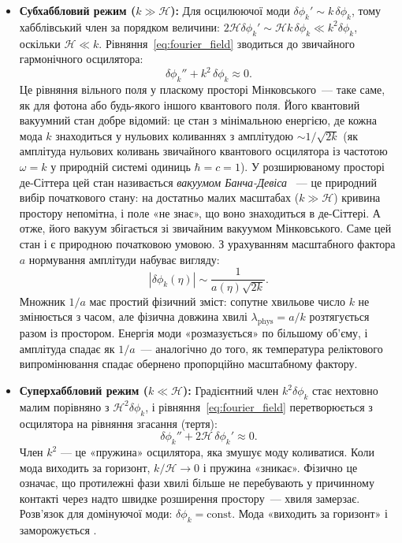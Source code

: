 \begin{itemize}
  \item \textbf{Субхаббловий режим ($k \gg \mathcal{H}$):}
        Для осцилюючої моди $\delta\phi_k' \sim k\,\delta\phi_k$, тому хабблівський член
        за порядком величини: $2\mathcal{H}\delta\phi_k' \sim \mathcal{H}k\,\delta\phi_k \ll k^2\delta\phi_k$,
        оскільки $\mathcal{H} \ll k$. Рівняння~\eqref{eq:fourier_field} зводиться до
        звичайного гармонічного осцилятора:
        \begin{equation*}
          \delta\phi_k'' + k^2\,\delta\phi_k \approx 0.
        \end{equation*}
        Це рівняння вільного поля у пласкому просторі Мінковського~--- таке саме,
        як для фотона або будь-якого іншого квантового поля. Його квантовий
        вакуумний стан добре відомий: це стан з мінімальною енергією, де кожна мода $k$
        знаходиться у нульових коливаннях з амплітудою $\sim 1/\sqrt{2k}$ (як амплітуда нульових коливань звичайного
        квантового осцилятора із частотою $\omega = k$ у природній системі одиниць $\hbar = c = 1$). У розширюваному просторі де-Сіттера цей стан
        називається \emph{вакуумом Банча-Девіса} \cite{bunch_davies_1978}~--- це
        природний вибір початкового стану: на достатньо малих масштабах ($k \gg \mathcal{H}$)
        кривина простору непомітна, і поле «не знає», що воно знаходиться в де-Сіттері.
        А отже, його вакуум збігається зі звичайним вакуумом Мінковського. Саме цей
        стан і є природною початковою умовою. З урахуванням масштабного фактора $a$
        нормування амплітуди набуває вигляду:
        \begin{equation*}
          |\delta\phi_k(\eta)| \sim \frac{1}{a(\eta) \sqrt{2k}}.
        \end{equation*}
        Множник $1/a$ має простий фізичний зміст: сопутне хвильове число $k$ не змінюється
        з часом, але фізична довжина хвилі $\lambda_\mathrm{phys} = a/k$ розтягується
        разом із простором. Енергія моди «розмазується» по більшому об'єму, і амплітуда
        спадає як $1/a$~--- аналогічно до того, як температура реліктового
        випромінювання спадає обернено пропорційно масштабному фактору.
  \item \textbf{Суперхаббловий режим ($k \ll \mathcal{H}$):}
        Градієнтний член $k^2\delta\phi_k$ стає нехтовно малим порівняно з
        $\mathcal{H}^2\delta\phi_k$, і рівняння~\eqref{eq:fourier_field} перетворюється
        з осцилятора на рівняння згасання (тертя):
        \begin{equation*}
          \delta\phi_k'' + 2\mathcal{H}\,\delta\phi_k' \approx 0.
        \end{equation*}
        Член $k^2$ — це «пружина» осцилятора, яка змушує моду коливатися. Коли мода
        виходить за горизонт, $k/\mathcal{H} \to 0$ і пружина «зникає». Фізично це означає,
        що протилежні фази хвилі більше не перебувають у причинному контакті через надто
        швидке розширення простору~--- хвиля замерзає. Розв'язок для домінуючої моди:
        $\delta\phi_k = \mathrm{const}$. Мода «виходить за горизонт» і заморожується \cite{hawking_1982}.


\end{itemize}
